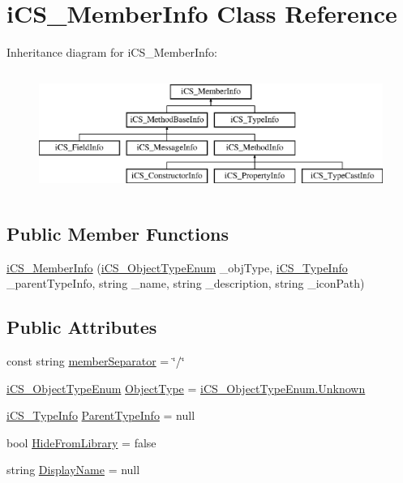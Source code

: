 \hypertarget{classi_c_s___member_info}{\section{i\+C\+S\+\_\+\+Member\+Info Class Reference}
\label{classi_c_s___member_info}
}
Inheritance diagram for i\+C\+S\+\_\+\+Member\+Info\+:\begin{figure}[H]
\begin{center}
\leavevmode
\includegraphics[height=4.000000cm]{classi_c_s___member_info}
\end{center}
\end{figure}
\subsection*{Public Member Functions}
\begin{DoxyCompactItemize}
\item 
\hyperlink{classi_c_s___member_info_acad4800cf5f3a37d54f071db01c38da5}{i\+C\+S\+\_\+\+Member\+Info} (\hyperlink{i_c_s___object_type_enum_8cs_ae6c3dd6d8597380b56d94908eb431547}{i\+C\+S\+\_\+\+Object\+Type\+Enum} \+\_\+obj\+Type, \hyperlink{classi_c_s___type_info}{i\+C\+S\+\_\+\+Type\+Info} \+\_\+parent\+Type\+Info, string \+\_\+name, string \+\_\+description, string \+\_\+icon\+Path)
\end{DoxyCompactItemize}
\subsection*{Public Attributes}
\begin{DoxyCompactItemize}
\item 
const string \hyperlink{classi_c_s___member_info_a878d9c2898871ac407c9e48b367772bb}{member\+Separator} = \char`\"{}/\char`\"{}
\item 
\hyperlink{i_c_s___object_type_enum_8cs_ae6c3dd6d8597380b56d94908eb431547}{i\+C\+S\+\_\+\+Object\+Type\+Enum} \hyperlink{classi_c_s___member_info_afd6682db43a328751174d1b09c76aa20}{Object\+Type} = \hyperlink{i_c_s___object_type_enum_8cs_ae6c3dd6d8597380b56d94908eb431547a88183b946cc5f0e8c96b2e66e1c74a7e}{i\+C\+S\+\_\+\+Object\+Type\+Enum.\+Unknown}
\item 
\hyperlink{classi_c_s___type_info}{i\+C\+S\+\_\+\+Type\+Info} \hyperlink{classi_c_s___member_info_a0c2771e3cd95afd78296f6f43391dfa8}{Parent\+Type\+Info} = null
\item 
bool \hyperlink{classi_c_s___member_info_aa91115af96d9f7a09b02ffd513c74901}{Hide\+From\+Library} = false
\item 
string \hyperlink{classi_c_s___member_info_af903be870f0cf5196ff4c1b2198a28cd}{Display\+Name} = null
\end{DoxyCompactItemize}
